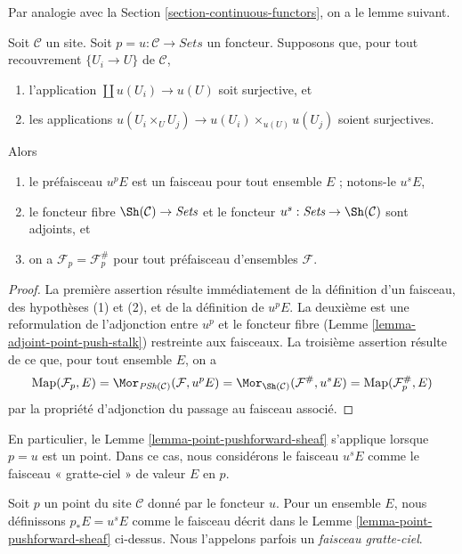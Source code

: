 \noindent
Par analogie avec la Section \ref{section-continuous-functors}, on a le lemme
suivant.

\begin{lemma}
\label{lemma-point-pushforward-sheaf}
Soit $\mathcal{C}$ un site. Soit
$p = u : \mathcal{C} \to \textit{Sets}$ un foncteur. Supposons que, pour tout
recouvrement $\{U_i \to U\}$ de $\mathcal{C}$,
\begin{enumerate}
\item l’application $\coprod u(U_i) \to u(U)$ soit surjective, et
\item les applications
$u(U_i \times_U U_j) \to u(U_i) \times_{u(U)} u(U_j)$ soient surjectives.
\end{enumerate}
Alors
\begin{enumerate}
\item le préfaisceau $u^pE$ est un faisceau pour tout ensemble $E$ ;
notons-le $u^sE$,
\item le foncteur fibre $\Sh(\mathcal{C}) \to \textit{Sets}$ et le foncteur
$u^s: \textit{Sets} \to \Sh(\mathcal{C})$ sont adjoints, et
\item on a $\mathcal{F}_p = \mathcal{F}^\#_p$ pour tout préfaisceau
d’ensembles $\mathcal{F}$.
\end{enumerate}
\end{lemma}

\begin{proof}
La première assertion résulte immédiatement de la définition d’un faisceau,
des hypothèses (1) et (2), et de la définition de $u^pE$. La deuxième est une
reformulation de l’adjonction entre $u^p$ et le foncteur fibre
(Lemme \ref{lemma-adjoint-point-push-stalk}) restreinte aux faisceaux.
La troisième assertion résulte de ce que, pour tout ensemble $E$, on a
$$
\text{Map}(\mathcal{F}_p, E) =
\Mor_{\textit{PSh}(\mathcal{C})}(\mathcal{F}, u^pE) =
\Mor_{\Sh(\mathcal{C})}(\mathcal{F}^\#, u^sE) =
\text{Map}(\mathcal{F}^\#_p, E)
$$
par la propriété d’adjonction du passage au faisceau associé.
\end{proof}

\noindent
En particulier, le Lemme \ref{lemma-point-pushforward-sheaf} s’applique
lorsque $p = u$ est un point. Dans ce cas, nous considérons le faisceau $u^sE$
comme le faisceau « gratte-ciel » de valeur $E$ en $p$.

\begin{definition}
\label{definition-pushforward-point}
Soit $p$ un point du site $\mathcal{C}$ donné par le foncteur $u$.
Pour un ensemble $E$, nous définissons $p_*E = u^sE$ comme le faisceau décrit
dans le Lemme \ref{lemma-point-pushforward-sheaf} ci-dessus.
Nous l’appelons parfois un {\it faisceau gratte-ciel}.
\end{definition}


